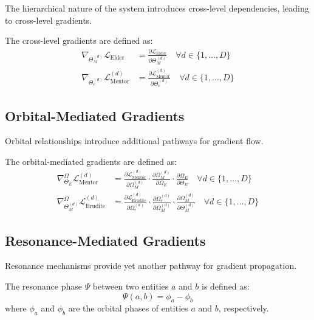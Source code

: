 The hierarchical nature of the system introduces cross-level dependencies, leading to cross-level gradients.

\begin{definition}
The cross-level gradients are defined as:
\begin{align}
\nabla_{\Theta_M^{(d)}} \mathcal{L}_{\text{Elder}} &= \frac{\partial \mathcal{L}_{\text{Elder}}}{\partial \Theta_M^{(d)}} \quad \forall d \in \{1, \ldots, D\} \\
\nabla_{\Theta_e^{(d)}} \mathcal{L}_{\text{Mentor}}^{(d)} &= \frac{\partial \mathcal{L}_{\text{Mentor}}^{(d)}}{\partial \Theta_e^{(d)}} \quad \forall d \in \{1, \ldots, D\}
\end{align}
\end{definition}

\subsection{Orbital-Mediated Gradients}

Orbital relationships introduce additional pathways for gradient flow.

\begin{definition}
The orbital-mediated gradients are defined as:
\begin{align}
\nabla_{\Theta_E}^{\Omega} \mathcal{L}_{\text{Mentor}}^{(d)} &= \frac{\partial \mathcal{L}_{\text{Mentor}}^{(d)}}{\partial \Omega_M^{(d)}} \cdot \frac{\partial \Omega_M^{(d)}}{\partial \Omega_E} \cdot \frac{\partial \Omega_E}{\partial \Theta_E} \quad \forall d \in \{1, \ldots, D\} \\
\nabla_{\Theta_M^{(d)}}^{\Omega} \mathcal{L}_{\text{Erudite}}^{(d)} &= \frac{\partial \mathcal{L}_{\text{Erudite}}^{(d)}}{\partial \Omega_e^{(d)}} \cdot \frac{\partial \Omega_e^{(d)}}{\partial \Omega_M^{(d)}} \cdot \frac{\partial \Omega_M^{(d)}}{\partial \Theta_M^{(d)}} \quad \forall d \in \{1, \ldots, D\}
\end{align}
\end{definition}

\subsection{Resonance-Mediated Gradients}

Resonance mechanisms provide yet another pathway for gradient propagation.

\begin{definition}
The resonance phase $\Psi$ between two entities $a$ and $b$ is defined as:
\begin{equation}
\Psi(a, b) = \phi_a - \phi_b
\end{equation}
where $\phi_a$ and $\phi_b$ are the orbital phases of entities $a$ and $b$, respectively.
\end{definition}

